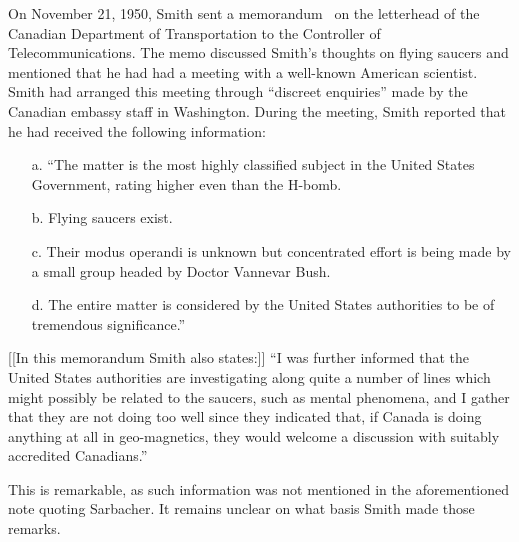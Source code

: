 On November 21, 1950, Smith sent a memorandum~\cite{SmithWilbertMemo} on the letterhead of the Canadian Department of Transportation to the Controller of Telecommunications. The memo discussed Smith's thoughts on flying saucers and mentioned that he had had a meeting with a well-known American scientist. Smith had arranged this meeting through ``discreet enquiries'' made by the Canadian embassy staff in Washington.
During the meeting, Smith reported that he had received the following information:
\begin{svgraybox}
\begin{enumerate}
\item[a.] ``The matter is the most highly classified subject in the United States
Government, rating higher even than the H-bomb.
\item[b.] Flying saucers exist.
\item[c.] Their modus operandi is unknown but concentrated effort is being
made
by a small group headed by Doctor Vannevar Bush.
\item[d.] The entire matter is considered by the United States authorities to be
of tremendous significance.''
\end{enumerate}

[[In this memorandum Smith also states:]] ``I was further informed that the United States authorities are
investigating along quite a number of lines which might possibly be
related to the saucers, such as mental phenomena, and I gather that they are
not doing too well since they indicated that, if Canada is doing anything
at all in geo-magnetics, they would welcome a discussion with suitably
accredited Canadians.''
\end{svgraybox}
This is remarkable, as such information was not mentioned in the aforementioned note quoting Sarbacher. It remains unclear on what basis Smith made those remarks.


